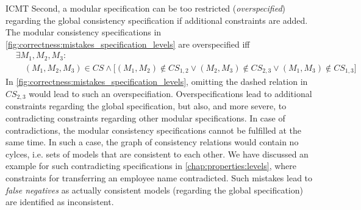 \begin{copiedFrom}{ICMT}
Second, a modular specification can be too restricted (\emph{overspecified}) regarding the global consistency specification if additional constraints are added. 
The modular consistency specifications in \autoref{fig:correctness:mistakes_specification_levels} are overspecified iff
\begin{align*}
    & \exists M_1, M_2, M_3 : \\
    & \hspace{1em} (M_1, M_2, M_3) \in \mathit{CS} \land \big[ (M_1, M_2) \not\in \mathit{CS}_{1,2} \lor (M_2, M_3) \not\in \mathit{CS}_{2,3} \lor (M_1, M_3) \not\in \mathit{CS}_{1,3} \big]
\end{align*}
In \autoref{fig:correctness:mistakes_specification_levels}, omitting the dashed relation in $\mathit{CS}_{2,3}$ would lead to such an overspecifiation.
Overspecifications lead to additional constraints regarding the global specification, but also, and more severe, to contradicting constraints regarding other modular specifications.
In case of contradictions, the modular consistency specifications cannot be fulfilled at the same time.
In such a case, the graph of consistency relations %
would contain no cylces, i.e. sets of models that are consistent to each other.
We have discussed an example for such contradicting specifications %
in \autoref{chap:properties:levels}, where constraints for transferring an employee name contradicted. %
Such mistakes lead to \emph{false negatives} as actually consistent models (regarding the global specification) are identified as inconsistent. %



\end{copiedFrom}
